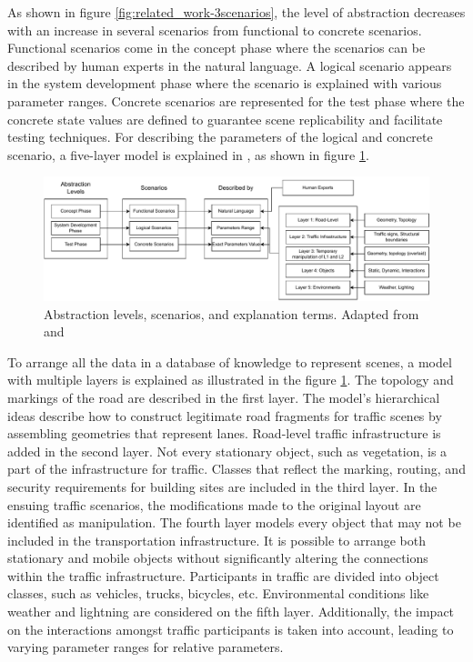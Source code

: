 As shown in figure \ref{fig:related_work-3scenarios}, the level of abstraction decreases with an increase in several scenarios from functional to concrete scenarios. Functional scenarios come in the concept phase where the scenarios can be described by human experts in the natural language. A logical scenario appears in the system development phase where the scenario is explained with various parameter ranges. Concrete scenarios are represented for the test phase where the concrete state values are defined to guarantee scene replicability and facilitate testing techniques. For describing the parameters of the logical and concrete scenario, a five-layer model is explained in \parencite{bagschik2018ontology}, as shown in figure \ref{fig:related_work-5layer_model}.

\begin{figure}[htbp]
    \centering
    \includegraphics[width=1\linewidth]{97_graphics/related_work/scenario_based_testing.pdf}
    \caption{Abstraction levels, scenarios, and explanation terms. Adapted from \parencite{bagschik2018ontology} and \parencite{menzel2018scenarios}
    }
    \label{fig:related_work-5layer_model}
\end{figure}

To arrange all the data in a database of knowledge to represent scenes, a model with multiple layers is explained as illustrated in the figure \ref{fig:related_work-5layer_model}. The topology and markings of the road are described in the first layer. The model's hierarchical ideas describe how to construct legitimate road fragments for traffic scenes by assembling geometries that represent lanes. Road-level traffic infrastructure is added in the second layer. Not every stationary object, such as vegetation, is a part of the infrastructure for traffic. Classes that reflect the marking, routing, and security requirements for building sites are included in the third layer. In the ensuing traffic scenarios, the modifications made to the original layout are identified as manipulation. The fourth layer models every object that may not be included in the transportation infrastructure. It is possible to arrange both stationary and mobile objects without significantly altering the connections within the traffic infrastructure. Participants in traffic are divided into object classes, such as vehicles, trucks, bicycles, etc. Environmental conditions like weather and lightning are considered on the fifth layer. Additionally, the impact on the interactions amongst traffic participants is taken into account, leading to varying parameter ranges for relative parameters.

